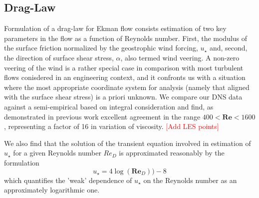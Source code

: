 \documentclass[a4paper,11pt]{article}
\newcommand{\todo}[1]{\textcolor{red}{$[$#1$]$}}
\begin{document}
\subsection{Drag-Law}
Formulation of a drag-law for Ekman flow consists estimation of two key parameters in the flow as a function of Reynolds number.
%
First, the modulus of the surface friction normalized by the geostrophic wind forcing, $u_\star$ and,
second, the direction of surface shear stress, $\alpha$, also termed wind veering. 
%
A non-zero veering of the wind is a rather special case in comparison with most turbulent flows conisdered in an
engineering context, and it confronts us with a situation where the most appropriate coordinate system for analysis
(namely that aligned with the surface shear stress) is a priori unknown. 
%
We compare our DNS data against a semi-empirical based on integral consideration \cite{Spalart:1989p2436}
and find, as demonstrated in previous work \cite{Ansorge:2014hf} excellent agreement in the range
 $400<\mathbf{Re}<1600$, representing a factor of 16 in variation of viscosity. 
%
\todo{Add LES points}
% 
\par
%
We also find that the solution of the transient equation involved in estimation of $u_\star$ for a given Reynolds number
$Re_D$ is approximated reasonably by the formulation
\begin{equation}
  u_\star= 4\log(\mathbf{Re}_D))-8
\end{equation}
which quantifies the 'weak' dependence of $u_\star$ on the Reynolds number as an approximately logarithmic one.
%
\end{document}
